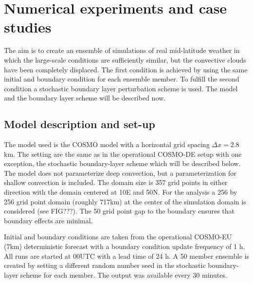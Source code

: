 \documentclass[a4paper, 12pt]{article}
\begin{document}
\section{Numerical experiments and case studies}
The aim is to create an ensemble of simulations of real mid-latitude weather in which the large-scale conditions are sufficiently similar, but the convective clouds have been completely displaced. The first condition is achieved by using the same initial and boundary condition for each ensemble member. To fulfill the second condition a stochastic boundary layer perturbation scheme is used. The model and the boundary layer scheme will be described now. 

\subsection{Model description and set-up}
The model used is the COSMO model \citep{Baldauf2011} with a horizontal grid spacing $\Delta x=$2.8\,km. The setting are the same as in the operational COSMO-DE setup with one exception, the stochastic boundary-layer scheme which will be described below. The model does not parameterize deep convection, but a parameterization for shallow convection is included. The domain size is 357 grid points in either direction with the domain centered at 10E and 50N. For the analysis a 256 by 256 grid point domain (roughly 717km) at the center of the simulation domain is considered (see FIG???). The 50 grid point gap to the boundary ensures that boundary effects are minimal. 

Initial and boundary conditions are taken from the operational COSMO-EU (7km) deterministic forecast with a boundary condition update frequency of 1 h. All runs are started at 00UTC with a lead time of 24 h. A 50 member ensemble is created by setting a different random number seed in the stochastic boundary-layer scheme for each member. The output was available every 30 minutes.
\end{document}
